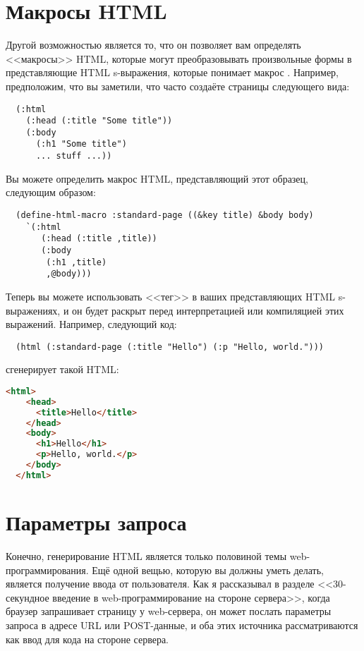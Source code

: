 \section{Макросы HTML}

Другой возможностью  является то, что он позволяет вам определять <<макросы>>
HTML, которые могут преобразовывать произвольные формы в представляющие HTML s-выражения,
которые понимает макрос . Например, предположим, что вы заметили, что часто
создаёте страницы следующего вида:

\begin{lstlisting}
  (:html
    (:head (:title "Some title"))
    (:body
      (:h1 "Some title")
      ... stuff ...))
\end{lstlisting}

Вы можете определить макрос HTML, представляющий этот образец, следующим образом:

\begin{lstlisting}
  (define-html-macro :standard-page ((&key title) &body body)
    `(:html
       (:head (:title ,title))
       (:body
        (:h1 ,title)
        ,@body)))
\end{lstlisting}

Теперь вы можете использовать <<тег>>  в ваших представляющих HTML
s-выражениях, и он будет раскрыт перед интерпретацией или компиляцией этих выражений.
Например, следующий код:

\begin{lstlisting}
  (html (:standard-page (:title "Hello") (:p "Hello, world.")))
\end{lstlisting}

сгенерирует такой HTML:

\begin{lstlisting}[language=HTML]
  <html>
    <head>
      <title>Hello</title>
    </head>
    <body>
      <h1>Hello</h1>
      <p>Hello, world.</p>
    </body>
  </html>
\end{lstlisting}

\section{Параметры запроса}

Конечно, генерирование HTML является только половиной темы web-программирования. Ещё одной
вещью, которую вы должны уметь делать, является получение ввода от пользователя. Как я
рассказывал в разделе <<30-секундное введение в web-программирование на стороне сервера>>,
когда браузер запрашивает страницу у web-сервера, он может послать параметры запроса в
адресе URL или POST-данные, и оба этих источника рассматриваются как ввод для кода на
стороне сервера.

